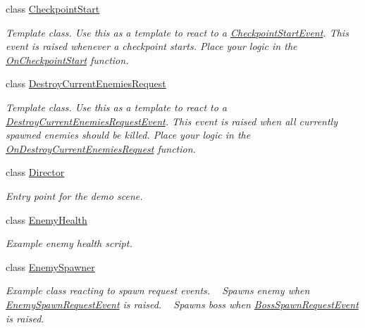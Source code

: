 \begin{DoxyCompactItemize}
class \hyperlink{class_round_manager_1_1_checkpoint_start}{Checkpoint\+Start}
\begin{DoxyCompactList}\small\item\em Template class. Use this as a template to react to a \hyperlink{class_round_manager_1_1_events_1_1_checkpoint_start_event}{Checkpoint\+Start\+Event}. This event is raised whenever a checkpoint starts. Place your logic in the \hyperlink{class_round_manager_1_1_checkpoint_start_a8e3cb1499eb403dc9dd1ba6baa1a3c13}{On\+Checkpoint\+Start} function. \end{DoxyCompactList}\item 
class \hyperlink{class_round_manager_1_1_destroy_current_enemies_request}{Destroy\+Current\+Enemies\+Request}
\begin{DoxyCompactList}\small\item\em Template class. Use this as a template to react to a \hyperlink{class_round_manager_1_1_events_1_1_destroy_current_enemies_request_event}{Destroy\+Current\+Enemies\+Request\+Event}. This event is raised when all currently spawned enemies should be killed. Place your logic in the \hyperlink{class_round_manager_1_1_destroy_current_enemies_request_a15c15c2db192f9bd78a1d2cf5bc6f372}{On\+Destroy\+Current\+Enemies\+Request} function. \end{DoxyCompactList}\item 
class \hyperlink{class_round_manager_1_1_director}{Director}
\begin{DoxyCompactList}\small\item\em Entry point for the demo scene. \end{DoxyCompactList}\item 
class \hyperlink{class_round_manager_1_1_enemy_health}{Enemy\+Health}
\begin{DoxyCompactList}\small\item\em Example enemy health script. \end{DoxyCompactList}\item 
class \hyperlink{class_round_manager_1_1_enemy_spawner}{Enemy\+Spawner}
\begin{DoxyCompactList}\small\item\em Example class reacting to spawn request events. ~\newline
Spawns enemy when \hyperlink{class_round_manager_1_1_events_1_1_enemy_spawn_request_event}{Enemy\+Spawn\+Request\+Event} is raised. ~\newline
Spawns boss when \hyperlink{class_round_manager_1_1_events_1_1_boss_spawn_request_event}{Boss\+Spawn\+Request\+Event} is raised. ~\newline

\end{DoxyCompactList}
\end{DoxyCompactItemize}
